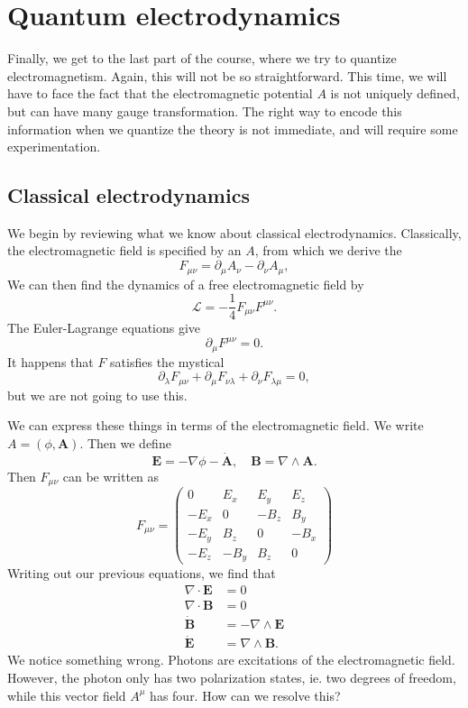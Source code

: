 \documentclass[a4paper]{article}
\begin{document}
\section{Quantum electrodynamics}
Finally, we get to the last part of the course, where we try to quantize electromagnetism. Again, this will not be so straightforward. This time, we will have to face the fact that the electromagnetic potential $A$ is not uniquely defined, but can have many gauge transformation. The right way to encode this information when we quantize the theory is not immediate, and will require some experimentation.

\subsection{Classical electrodynamics}
We begin by reviewing what we know about classical electrodynamics. Classically, the electromagnetic field is specified by an  $A$, from which we derive the 
\[
  F_{\mu\nu} = \partial_\mu A_\nu - \partial_\nu A_\mu,
\]
We can then find the dynamics of a free electromagnetic field by
\[
  \mathcal{L} = -\frac{1}{4} F_{\mu\nu}F^{\mu\nu}.
\]
The Euler-Lagrange equations give
\[
  \partial_\mu F^{\mu\nu} = 0.
\]
It happens that $F$ satisfies the mystical 
\[
  \partial_\lambda F_{\mu\nu} + \partial_\mu F_{\nu\lambda} + \partial_\nu F_{\lambda\mu} = 0,
\]
but we are not going to use this.

We can express these things in terms of the electromagnetic field. We write $A = (\phi, \mathbf{A})$. Then we define
\[
  \mathbf{E} = - \nabla \phi - \dot{\mathbf{A}},\quad \mathbf{B} = \nabla\wedge \mathbf{A}.
\]
Then $F_{\mu\nu}$ can be written as
\[
  F_{\mu\nu} =
  \begin{pmatrix}
    0 & E_x & E_y & E_z\\
    -E_x & 0 & -B_z & B_y\\
    -E_y & B_z & 0 & -B_x\\
    -E_z & -B_y & B_z & 0
  \end{pmatrix}
\]
Writing out our previous equations, we find that
\begin{align*}
  \nabla \cdot \mathbf{E} &= 0\\
  \nabla \cdot \mathbf{B} &= 0\\
  \dot{\mathbf{B}} &= - \nabla \wedge \mathbf{E}\\
  \dot{\mathbf{E}} &= \nabla \wedge \mathbf{B}.
\end{align*}
We notice something wrong. Photons are excitations of the electromagnetic field. However, the photon only has two polarization states, ie. two degrees of freedom, while this vector field $A^\mu$ has four. How can we resolve this?
\end{document}
